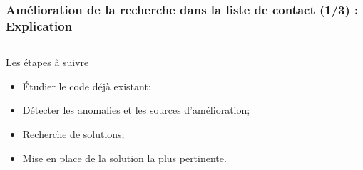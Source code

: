 \begin{frame}
	\frametitle{Amélioration de la recherche dans la liste de contact (1/3) : Explication}

    \begin{columns}[t]
  \begin{column}{5cm}
	  \begin{block}{Les étapes à suivre}
	    \begin{itemize}
	    	\item Étudier le code déjà existant;
	    	\item Détecter les anomalies et les sources d'amélioration;
	    	\item Recherche de solutions;
	    	\item Mise en place de la solution la plus pertinente.
	    \end{itemize}
	  \end{block} 
  \end{column}
  

\end{columns}
\end{frame}
